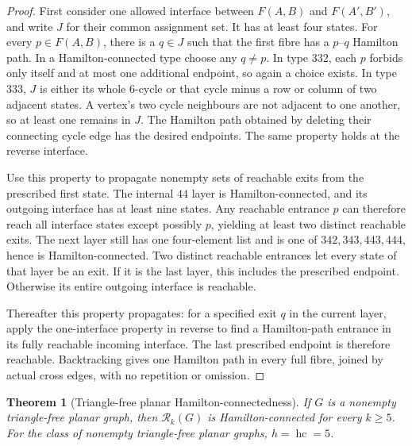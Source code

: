 \documentclass[11pt]{article}
\newtheorem{theorem}{Theorem}[section]
\theoremstyle{remark}
\newcommand{\Rk}{\mathcal R_k}
\newcommand{\hc}{\operatorname{hc}}
\numberwithin{equation}{section}
\numberwithin{table}{section}
\begin{document}
\begin{proof}
First consider one allowed interface between $F(A,B)$ and $F(A',B')$,
and write $J$ for their common assignment set.  It has at least four
states.  For every $p\in F(A,B)$, there is a $q\in J$ such that the
first fibre has a $p$--$q$ Hamilton path.  In a Hamilton-connected
type choose any $q\ne p$.  In type $332$, each $p$ forbids only
itself and at most one additional endpoint, so again a choice exists.
In type $333$, $J$ is either its whole $6$-cycle or that cycle minus
a row or column of two adjacent states.  A vertex's two cycle
neighbours are not adjacent to one another, so at least one remains in
$J$.  The Hamilton path obtained by deleting their connecting cycle
edge has the desired endpoints.  The same property holds at the
reverse interface.

Use this property to propagate nonempty sets of reachable exits from
the prescribed first state.  The internal $44$ layer is
Hamilton-connected, and its outgoing interface has at least nine states.
Any reachable entrance $p$ can therefore reach all interface states
except possibly $p$, yielding at least two distinct reachable exits.
The next layer still has one four-element list and is one of
$342,343,443,444$, hence is Hamilton-connected.  Two distinct reachable
entrances let every state of that layer be an exit.  If it is the last
layer, this includes the prescribed endpoint.  Otherwise its entire
outgoing interface is reachable.

Thereafter this property propagates: for a specified exit $q$ in the
current layer, apply the one-interface property in reverse to find a
Hamilton-path entrance in its fully reachable incoming interface.
The last prescribed endpoint is therefore reachable.  Backtracking
gives one Hamilton path in every full fibre, joined by actual cross
edges, with no repetition or omission.
\end{proof}

\begin{theorem}[Triangle-free planar Hamilton-connectedness]
\label{thm:trianglefree-hc}
If $G$ is a nonempty triangle-free planar graph, then $\Rk(G)$ is
Hamilton-connected for every $k\ge5$.  For the class of nonempty
triangle-free planar graphs,
$h=\hc=5$.
\end{theorem}
\end{document}
